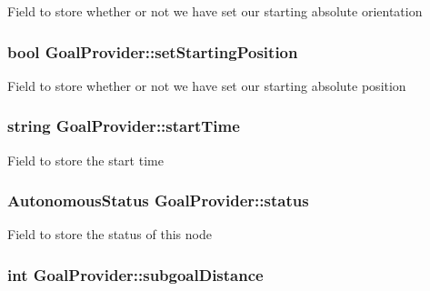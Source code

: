 \-Field to store whether or not we have set our starting absolute orientation \hypertarget{classGoalProvider_aae2c69715ab4565f5d0e96cd16411444}{
\subsubsection[{set\-Starting\-Position}]{\setlength{\rightskip}{0pt plus 5cm}bool {\bf \-Goal\-Provider\-::set\-Starting\-Position}}}\label{classGoalProvider_aae2c69715ab4565f5d0e96cd16411444}
\-Field to store whether or not we have set our starting absolute position \hypertarget{classGoalProvider_a6329ae18effbfa5a6eddf9956851c973}{
\subsubsection[{start\-Time}]{\setlength{\rightskip}{0pt plus 5cm}string {\bf \-Goal\-Provider\-::start\-Time}}}\label{classGoalProvider_a6329ae18effbfa5a6eddf9956851c973}
\-Field to store the start time \hypertarget{classGoalProvider_aecddfd46c7aba939da77c5a207a97039}{
\subsubsection[{status}]{\setlength{\rightskip}{0pt plus 5cm}\-Autonomous\-Status {\bf \-Goal\-Provider\-::status}}}\label{classGoalProvider_aecddfd46c7aba939da77c5a207a97039}
\-Field to store the status of this node \hypertarget{classGoalProvider_ad4a03daf04350450ceee088c9f5f6c54}{
\subsubsection[{subgoal\-Distance}]{\setlength{\rightskip}{0pt plus 5cm}int {\bf \-Goal\-Provider\-::subgoal\-Distance}}}\label{classGoalProvider_ad4a03daf04350450ceee088c9f5f6c54}

